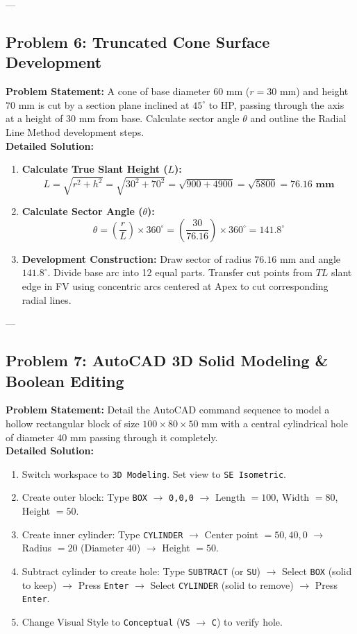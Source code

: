 ---

\subsection{Problem 6: Truncated Cone Surface Development}
\textbf{Problem Statement:} A cone of base diameter $60\text{ mm}$ ($r = 30\text{ mm}$) and height $70\text{ mm}$ is cut by a section plane inclined at $45^\circ$ to HP, passing through the axis at a height of $30\text{ mm}$ from base. Calculate sector angle $\theta$ and outline the Radial Line Method development steps.\\[4pt]
\textbf{Detailed Solution:}
\begin{enumerate}
    \item \textbf{Calculate True Slant Height ($L$):}
    $$L = \sqrt{r^2 + h^2} = \sqrt{30^2 + 70^2} = \sqrt{900 + 4900} = \sqrt{5800} = \mathbf{76.16\text{ mm}}$$
    \item \textbf{Calculate Sector Angle ($\theta$):}
    $$\theta = \left( \frac{r}{L} \right) \times 360^\circ = \left( \frac{30}{76.16} \right) \times 360^\circ = \mathbf{141.8^\circ}$$
    \item \textbf{Development Construction:} Draw sector of radius $76.16\text{ mm}$ and angle $141.8^\circ$. Divide base arc into 12 equal parts. Transfer cut points from $TL$ slant edge in FV using concentric arcs centered at Apex to cut corresponding radial lines.
\end{enumerate}

---

\subsection{Problem 7: AutoCAD 3D Solid Modeling \& Boolean Editing}
\textbf{Problem Statement:} Detail the AutoCAD command sequence to model a hollow rectangular block of size $100 \times 80 \times 50\text{ mm}$ with a central cylindrical hole of diameter $40\text{ mm}$ passing through it completely.\\[4pt]
\textbf{Detailed Solution:}
\begin{enumerate}
    \item Switch workspace to \texttt{3D Modeling}. Set view to \texttt{SE Isometric}.
    \item Create outer block: Type \texttt{BOX} $\to$ \texttt{0,0,0} $\to$ Length $= 100$, Width $= 80$, Height $= 50$.
    \item Create inner cylinder: Type \texttt{CYLINDER} $\to$ Center point $= 50,40,0$ $\to$ Radius $= 20$ (Diameter $40$) $\to$ Height $= 50$.
    \item Subtract cylinder to create hole: Type \texttt{SUBTRACT} (or \texttt{SU}) $\to$ Select \texttt{BOX} (solid to keep) $\to$ Press \texttt{Enter} $\to$ Select \texttt{CYLINDER} (solid to remove) $\to$ Press \texttt{Enter}.
    \item Change Visual Style to \texttt{Conceptual} (\texttt{VS} $\to$ \texttt{C}) to verify hole.
\end{enumerate}
